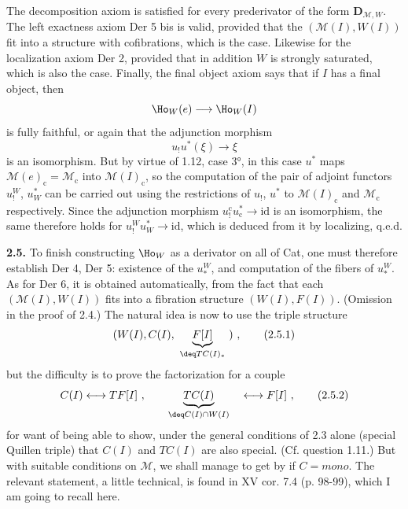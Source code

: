 
The decomposition axiom is satisfied for every prederivator of the form $\mathbf{D}_{\mathcal{M},W}$. The left exactness axiom Der 5 bis is valid, provided that the $(\mathcal{M}(I),W(I))$ fit into a structure with cofibrations, which is the case. Likewise for the localization axiom Der 2, provided that in addition $W$ is strongly saturated, which is also the case. Finally, the final object axiom says that if $I$ has a final object, then
\[ \Ho_W(e) \longrightarrow \Ho_W(I) \]
is fully faithful, or again that the adjunction morphism
\[ u_!u^*(\xi) \longrightarrow \xi \]
is an isomorphism. But by virtue of 1.12, case 3°, in this case $u^*$ maps $\mathcal{M}(e)_{\mathrm{c}} = \mathcal{M}_{\mathrm{c}}$ into $\mathcal{M}(I)_{\mathrm{c}}$, so the computation of the pair of adjoint functors $u_!^W$, $u_W^*$ can be carried out using the restrictions of $u_!$, $u^*$ to $\mathcal{M}(I)_{\mathrm{c}}$ and $\mathcal{M}_{\mathrm{c}}$ respectively. Since the adjunction morphism $u_!^{\mathrm{c}}u_{\mathrm{c}}^* \longrightarrow \mathrm{id}$ is an isomorphism, the same therefore holds for $u_!^W u_W^* \longrightarrow \mathrm{id}$, which is deduced from it by localizing, q.e.d.

\textbf{2.5.} To finish constructing $\Ho_W$ as a derivator on all of Cat, one must  therefore establish Der 4, Der 5: existence of the $u_*^W$, and computation of the fibers of $u_*^W$. As for Der 6, it is obtained automatically, from the fact that each $(\mathcal{M}(I),W(I))$ fits into a fibration structure $(W(I),F(I))$. (Omission in the proof of 2.4.) The natural idea is now to use the triple structure
\[ (W(I),C(I),\ \underbrace{F[I]}_{\deq TC(I)_*}\ )\ , \tag*{(2.5.1)} \]
but the difficulty is to prove the factorization for a couple
\[ C(I) \longleftrightarrow TF[I]\ , \qquad \underbrace{TC(I)}_{\deq C(I)\cap W(I)} \quad \longleftrightarrow F[I]\ , \tag*{(2.5.2)} \]
for want of being able to show, under the general conditions of 2.3 alone (special Quillen triple) that $C(I)$ and $TC(I)$ are also special. (Cf. question 1.11.) But with suitable conditions on $\mathcal{M}$, we shall manage to get by if $C = \mathit{mono}$. The relevant statement, a little technical, is found in XV cor. 7.4 (p. 98-99), which I am going to recall here.



